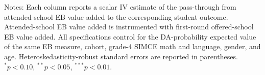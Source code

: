 \begin{table}[!htbp]
\centering
\caption{Main scalar school-value IV estimates using EB-shrunken value added}
\label{tab:scalar_school_value_iv_main_five_expected_va_eb}
\par\medskip
\footnotesize
\begin{minipage}{\textwidth}
Notes: Each column reports a scalar IV estimate of the pass-through from attended-school EB value added to the corresponding student outcome. Attended-school EB value added is instrumented with first-round offered-school EB value added. All specifications control for the DA-probability expected value of the same EB measure, cohort, grade-4 SIMCE math and language, gender, and age. Heteroskedasticity-robust standard errors are reported in parentheses. $^{*}p<0.10$, $^{**}p<0.05$, $^{***}p<0.01$.
\end{minipage}
\end{table}
